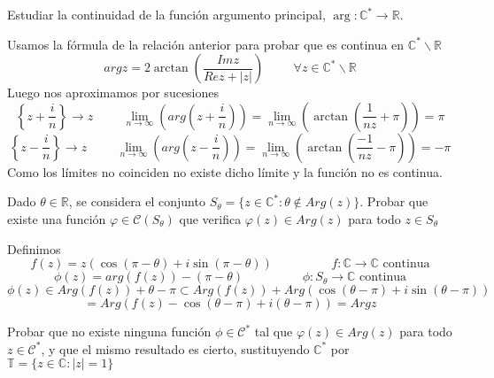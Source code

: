 \begin{ejer}
	Estudiar la continuidad de la función argumento principal, $\arg : \mathbb{C}^{\ast} \rightarrow \mathbb{R}$.
\end{ejer}

\begin{sol}
	
	
	Usamos la fórmula de la relación anterior para probar que es continua en $\mathbb{C}^{\ast} \backslash \mathbb{R}$
	$$  
	arg z = 2\arctan \left(\frac{Imz}{Rez + |z|}\right) \hspace{1cm} \forall z\in\mathbb{C}^{\ast}\backslash\mathbb{R}
	$$
	Luego nos aproximamos por sucesiones
	$$  
	\left\{ z+\frac{i}{n} \right\} \rightarrow z \hspace{1cm}
	\lim_{n\rightarrow\infty}\left(arg\left(z+\frac{i}{n}\right)\right) = \lim_{n\rightarrow\infty}\left( \arctan\left(\frac{1}{nz}+\pi\right) \right) = \pi
	$$
	$$
	\left\{ z-\frac{i}{n} \right\} \rightarrow z \hspace{1cm}
	\lim_{n\rightarrow\infty}\left(arg\left(z-\frac{i}{n}\right)\right) = \lim_{n\rightarrow\infty}\left( \arctan\left(\frac{-1}{nz}-\pi\right) \right) = -\pi
	$$
	Como los límites no coinciden no existe dicho límite y la función no es continua.
\end{sol}

\begin{ejer}
	Dado $\theta\in\mathbb{R}$, se considera el conjunto $S_{\theta} = \{ z\in\mathbb{C}^{\ast} : \theta\not\in Arg(z) \}$. 
	Probar que existe una función $\varphi\in\mathcal{C}(S_{\theta})$ que verifica $\varphi(z)\in Arg(z)$ para todo $z\in S_{\theta}$
\end{ejer}

\begin{sol}
	Definimos
	$$
	f(z) = z( \cos(\pi-\theta) + i\sin(\pi-\theta) ) \hspace{2cm} f:\mathbb{C}\rightarrow \mathbb{C} \text{ continua}
	$$
	$$
	\phi(z) = arg(f(z)) - (\pi-\theta) \hspace{2cm} \phi: S_{\theta} \rightarrow \mathbb{C} \text{ continua}
	$$
	$$ 
	\phi(z) \in Arg (f(z)) + \theta-\pi \subset Arg (f(z)) + Arg( \cos(\theta-\pi)+i\sin(\theta-\pi) ) 
	$$
	$$= Arg ( f(z)-\cos(\theta-\pi)+i(\theta-\pi) ) = Argz
	$$
\end{sol}

\begin{ejer}
	Probar que no existe ninguna función $\phi\in\mathcal{C}^{\ast}$ tal que $\varphi(z)\in Arg(z)$ para todo $z\in\mathcal{C}^{\ast}$, y que el mismo resultado es cierto, sustituyendo $\mathbb{C}^{\ast}$ por $\mathbb{T}=\{ z\in\mathbb{C} : |z|=1 \}$
\end{ejer}

